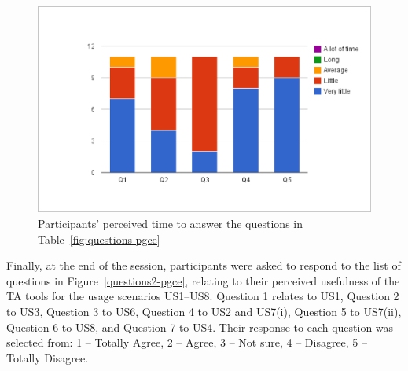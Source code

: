 
\begin{figure}[htbp]
  \centering
    \includegraphics[width=\textwidth]{gfx/perceived-time-Q1-Q5.eps}
  \caption{Participants' perceived time to answer the questions in
Table~\ref{fig:questions-pgce}} 
\label{fig:perceived-time}
\end{figure}


Finally, at the end of the session, 
participants were asked to respond to the list of
questions in Figure~\ref{questions2-pgce}, 
relating to their perceived usefulness of the TA tools for
the usage scenarios US1--US8. Question 1 relates to US1, Question 2 to US3, 
Question 3 to US6, Question 4 to US2 and US7(i), Question 5 to US7(ii), 
Question 6 to US8, and Question 7 to US4. Their
response to each question was selected from: 1 -- Totally Agree,
2 -- Agree, 3 -- Not sure, 4 -- Disagree, 5 -- Totally Disagree.

